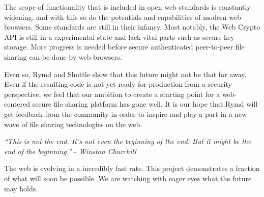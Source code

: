 The scope of functionality that is included in open web standards is constantly widening, and with this so do the potentials and capabilities of modern web browsers. Some standards are still in their infancy. Most notably, the Web Crypto API is still in a experimental state and lack vital parts such as secure key storage. More progress is needed before secure authenticated peer-to-peer file sharing can be done by web browsers.

Even so, Rymd and Shuttle show that this future might not be that far away. Even if the resulting code is not yet ready for production from a security perspective, we feel that our ambition to create a starting point for a web-centered secure file sharing platform has gone well. It is our hope that Rymd will get feedback from the community in order to inspire and play a part in a new wave of file sharing technologies on the web.


\emph{``This is not the end. It's not even the beginning of the end. But it might be the end of the beginning.'' - Winston Churchill}

The web is evolving in a incredibly fast rate. This project demonstrates a fraction of what will soon be possible. We are watching with eager eyes what the future may holds.

